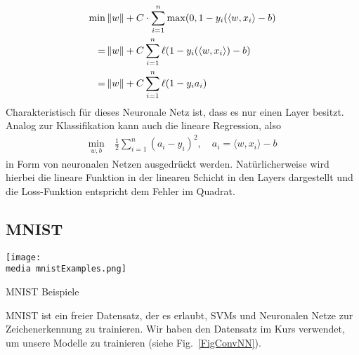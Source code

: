 \begin{align*}
\min &\left\lVert w\right\rVert + C \cdot \sum_{i=1}^{n} \max (0, 1-y_i (\langle w,x_i\rangle-b) \\
 = &\left\lVert w\right\rVert + C \sum_{i=1}^{n} \ell ( 1-y_i (\langle w,x_i\rangle)-b) \\
=&\left\lVert w\right\rVert + C \sum_{i=1}^{n} \ell (1 - y_i a_i)
\end{align*}
Charakteristisch für dieses Neuronale Netz ist, dass es nur einen Layer besitzt.\\
%
Analog zur Klassifikation kann auch die lineare Regression, also
\begin{align*}
\min\limits_{w,b} \ & \frac{1} {2} \sum_{i=1}^{n} (a_i -y_i)^2, \quad a_i = \langle w,x_i\rangle -b
\end{align*}
in Form von neuronalen Netzen ausgedrückt werden. Nat\"urlicherweise wird hierbei die lineare Funktion in der linearen Schicht in den Layers dargestellt und die Loss-Funktion entspricht dem Fehler im Quadrat.


\subsection{MNIST}

\begin{dsafigure}
	\begin{center}
		\texttt{[image: \\media mnistExamples.png]}
		\caption{MNIST Beispiele}
		\label{FigConvNN}
	\end{center}
\end{dsafigure}

MNIST ist ein freier Datensatz, der es erlaubt, SVMs und Neuronalen Netze zur Zeichenerkennung zu trainieren. Wir haben den Datensatz im Kurs verwendet, um unsere Modelle zu trainieren (siehe Fig.~\ref{FigConvNN}).




